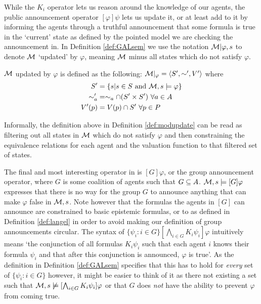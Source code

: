 While the $K_i$ operator lets us reason around the knowledge of our agents, the public announcement operator $[\varphi]\psi$ lets us update it, or at least add to it by informing the agents through a truthful announcement that some formula is true in the `current' state as defined by the pointed model we are checking the announcement in.
In Definition \ref{def:GALsem} we use the notation $\mathcal{M}|\varphi,s$ to denote $\mathcal{M}$ `updated' by $\varphi$, meaning $\mathcal{M}$ minus all states which do not satisfy $\varphi$.

\begin{definition}
	\label{def:modupdate}
	$\mathcal{M}$ updated by $\varphi$ is defined as the following: $\mathcal{M}|_\varphi = \langle S',\sim',V'\rangle$ where 
	\begin{align*}
			S' &= \{s| s\in S\textrm{ and }\mathcal{M},s \models\varphi\} \\
			\sim_a' &= \sim_a \cap (S' \times S')~ \forall a\in A\\
			V'(p) &= V(p) \cap S'~ \forall p \in P
	\end{align*}
\end{definition}

Informally, the definition above in Definition \ref{def:modupdate} can be read as filtering out all states in $\mathcal{M}$ which do not satisfy $\varphi$ and then constraining the equivalence relations for each agent and the valuation function to that filtered set of states.

The final and most interesting operator in  is $[G]\varphi$, or the group announcement operator, where $G$ is some coalition of agents such that $G \subseteq A$. $\mathcal{M},s \models [G]\varphi$ expresses that there is no way for the group $G$ to announce anything that can make $\varphi$ false in $\mathcal{M},s$. Note however that the formulas the agents in $[G]$ can announce are constrained to basic epistemic formulas, or to  as defined in Definition \ref{def:langel} in order to avoid making our definition of group announcements circular.  The syntax of $\{\psi_i: i\in G\}[\bigwedge_{i\in G}K_i\psi_i]\varphi$ intuitively means `the conjunction of all formulas $K_i\psi_i$ such that each agent $i$ knows their formula $\psi_i$ and that after this conjunction is announced, $\varphi$ is true'. As the definition in Definition \ref{def:GALsem} specifies that this has to hold for \textit{every} set of $\{\psi_i : i\in G\}$ however, it might be easier to think of it as there not existing a set such that $\mathcal{M},s \not\models [\bigwedge_{i\in G}K_i\psi_i]\varphi$ or that $G$ does \textit{not} have the ability to prevent $\varphi$ from coming true.

